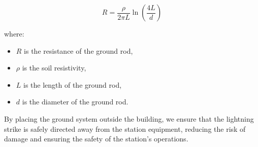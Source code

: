 \[
R = \frac{\rho}{2\pi L} \ln\left(\frac{4L}{d}\right)
\]

where:
\begin{itemize}
    \item \( R \) is the resistance of the ground rod,
    \item \( \rho \) is the soil resistivity,
    \item \( L \) is the length of the ground rod,
    \item \( d \) is the diameter of the ground rod.
\end{itemize}

By placing the ground system outside the building, we ensure that the lightning strike is safely directed away from the station equipment, reducing the risk of damage and ensuring the safety of the station’s operations.

